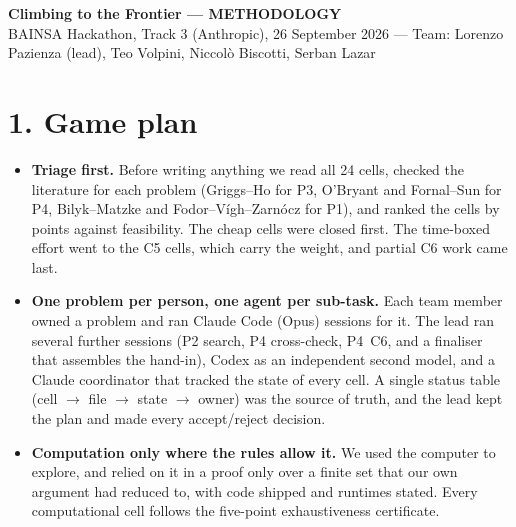 \documentclass[10pt]{article}
\begin{document}
\begin{center}
{\Large\bfseries Climbing to the Frontier --- METHODOLOGY}\\[2pt]
BAINSA Hackathon, Track 3 (Anthropic), 26 September 2026 --- Team: Lorenzo Pazienza (lead), Teo Volpini, Niccol\`o Biscotti, Serban Lazar
\end{center}

\section*{1. Game plan}
\begin{itemize}
\item \textbf{Triage first.} Before writing anything we read all 24 cells, checked the literature for each problem (Griggs--Ho for P3, O'Bryant and Fornal--Sun for P4, Bilyk--Matzke and Fodor--V\'igh--Zarn\'ocz for P1), and ranked the cells by points against feasibility. The cheap cells were closed first. The time-boxed effort went to the C5 cells, which carry the weight, and partial C6 work came last.
\item \textbf{One problem per person, one agent per sub-task.} Each team member owned a problem and ran Claude Code (Opus) sessions for it. The lead ran several further sessions (P2 search, P4 cross-check, P4~C6, and a finaliser that assembles the hand-in), Codex as an independent second model, and a Claude coordinator that tracked the state of every cell. A single status table (cell $\to$ file $\to$ state $\to$ owner) was the source of truth, and the lead kept the plan and made every accept/reject decision.
\item \textbf{Computation only where the rules allow it.} We used the computer to explore, and relied on it in a proof only over a finite set that our own argument had reduced to, with code shipped and runtimes stated. Every computational cell follows the five-point exhaustiveness certificate.
\end{itemize}
\end{document}
